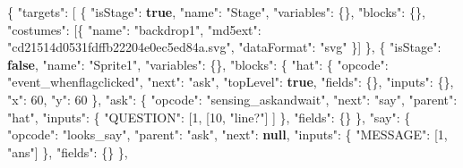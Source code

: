 \documentclass[
]{article}
\newenvironment{Shaded}{}{}
\newcommand{\DataTypeTok}[1]{\textcolor[rgb]{0.56,0.13,0.00}{#1}}
\newcommand{\DecValTok}[1]{\textcolor[rgb]{0.25,0.63,0.44}{#1}}
\newcommand{\FunctionTok}[1]{\textcolor[rgb]{0.02,0.16,0.49}{#1}}
\newcommand{\KeywordTok}[1]{\textcolor[rgb]{0.00,0.44,0.13}{\textbf{#1}}}
\newcommand{\OtherTok}[1]{\textcolor[rgb]{0.00,0.44,0.13}{#1}}
\newcommand{\StringTok}[1]{\textcolor[rgb]{0.25,0.44,0.63}{#1}}
\begin{document}
\begin{Shaded}
\begin{Highlighting}[]
\FunctionTok{\{}
  \DataTypeTok{"targets"}\FunctionTok{:} \OtherTok{[}
    \FunctionTok{\{} \DataTypeTok{"isStage"}\FunctionTok{:} \KeywordTok{true}\FunctionTok{,} \DataTypeTok{"name"}\FunctionTok{:} \StringTok{"Stage"}\FunctionTok{,} \DataTypeTok{"variables"}\FunctionTok{:} \FunctionTok{\{\},} \DataTypeTok{"blocks"}\FunctionTok{:} \FunctionTok{\{\},}
      \DataTypeTok{"costumes"}\FunctionTok{:} \OtherTok{[}\FunctionTok{\{} \DataTypeTok{"name"}\FunctionTok{:} \StringTok{"backdrop1"}\FunctionTok{,} \DataTypeTok{"md5ext"}\FunctionTok{:} \StringTok{"cd21514d0531fdffb22204e0ec5ed84a.svg"}\FunctionTok{,} \DataTypeTok{"dataFormat"}\FunctionTok{:} \StringTok{"svg"} \FunctionTok{\}}\OtherTok{]} \FunctionTok{\}}\OtherTok{,}
    \FunctionTok{\{} \DataTypeTok{"isStage"}\FunctionTok{:} \KeywordTok{false}\FunctionTok{,} \DataTypeTok{"name"}\FunctionTok{:} \StringTok{"Sprite1"}\FunctionTok{,} \DataTypeTok{"variables"}\FunctionTok{:} \FunctionTok{\{\},} \DataTypeTok{"blocks"}\FunctionTok{:} \FunctionTok{\{}
        \DataTypeTok{"hat"}\FunctionTok{:}  \FunctionTok{\{} \DataTypeTok{"opcode"}\FunctionTok{:} \StringTok{"event\_whenflagclicked"}\FunctionTok{,} \DataTypeTok{"next"}\FunctionTok{:} \StringTok{"ask"}\FunctionTok{,} \DataTypeTok{"topLevel"}\FunctionTok{:} \KeywordTok{true}\FunctionTok{,} \DataTypeTok{"fields"}\FunctionTok{:} \FunctionTok{\{\},} \DataTypeTok{"inputs"}\FunctionTok{:} \FunctionTok{\{\},} \DataTypeTok{"x"}\FunctionTok{:} \DecValTok{60}\FunctionTok{,} \DataTypeTok{"y"}\FunctionTok{:} \DecValTok{60} \FunctionTok{\},}
        \DataTypeTok{"ask"}\FunctionTok{:}  \FunctionTok{\{} \DataTypeTok{"opcode"}\FunctionTok{:} \StringTok{"sensing\_askandwait"}\FunctionTok{,} \DataTypeTok{"next"}\FunctionTok{:} \StringTok{"say"}\FunctionTok{,} \DataTypeTok{"parent"}\FunctionTok{:} \StringTok{"hat"}\FunctionTok{,}
                  \DataTypeTok{"inputs"}\FunctionTok{:} \FunctionTok{\{} \DataTypeTok{"QUESTION"}\FunctionTok{:} \OtherTok{[}\DecValTok{1}\OtherTok{,} \OtherTok{[}\DecValTok{10}\OtherTok{,} \StringTok{"line?"}\OtherTok{]} \OtherTok{]} \FunctionTok{\},} \DataTypeTok{"fields"}\FunctionTok{:} \FunctionTok{\{\}} \FunctionTok{\},}
        \DataTypeTok{"say"}\FunctionTok{:}  \FunctionTok{\{} \DataTypeTok{"opcode"}\FunctionTok{:} \StringTok{"looks\_say"}\FunctionTok{,} \DataTypeTok{"parent"}\FunctionTok{:} \StringTok{"ask"}\FunctionTok{,} \DataTypeTok{"next"}\FunctionTok{:} \KeywordTok{null}\FunctionTok{,}
                  \DataTypeTok{"inputs"}\FunctionTok{:} \FunctionTok{\{} \DataTypeTok{"MESSAGE"}\FunctionTok{:} \OtherTok{[}\DecValTok{1}\OtherTok{,} \StringTok{"ans"}\OtherTok{]} \FunctionTok{\},} \DataTypeTok{"fields"}\FunctionTok{:} \FunctionTok{\{\}} \FunctionTok{\},}

\end{Highlighting}
\end{Shaded}
\end{document}
